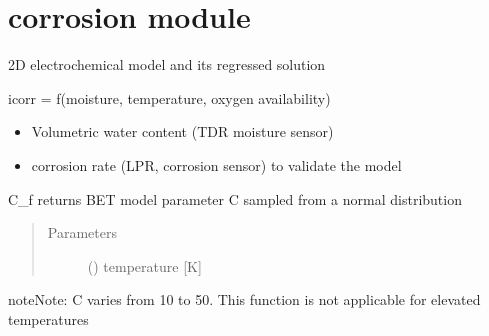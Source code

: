 \documentclass[letterpaper,10pt,english]{sphinxmanual}
\begin{document}
\section{corrosion module}
\label{\detokenize{corrosion:module-corrosion}}\label{\detokenize{corrosion:corrosion-module}}\label{\detokenize{corrosion::doc}}
\sphinxAtStartPar
{}

\sphinxAtStartPar
2D electrochemical model and its regressed solution

\sphinxAtStartPar
icorr = f(moisture, temperature, oxygen availability)

\sphinxAtStartPar
{}
\begin{itemize}
\item {} 
\sphinxAtStartPar
Volumetric water content (TDR moisture sensor)

\item {} 
\sphinxAtStartPar
corrosion rate (LPR, corrosion sensor) to validate the model

\end{itemize}

\begin{fulllineitems}
\label{\detokenize{corrosion:corrosion.C_f}}
\sphinxAtStartPar
C\_f returns BET model parameter C sampled from a normal distribution
\begin{quote}\begin{description}
\item[{Parameters}] \leavevmode
\sphinxAtStartPar
{} () \textendash{} temperature {[}K{]}

\end{description}\end{quote}

\begin{sphinxadmonition}{note}{Note:}
\sphinxAtStartPar
C varies from 10 to 50. This function is not applicable for elevated temperatures
\end{sphinxadmonition}

\end{fulllineitems}
\end{document}

